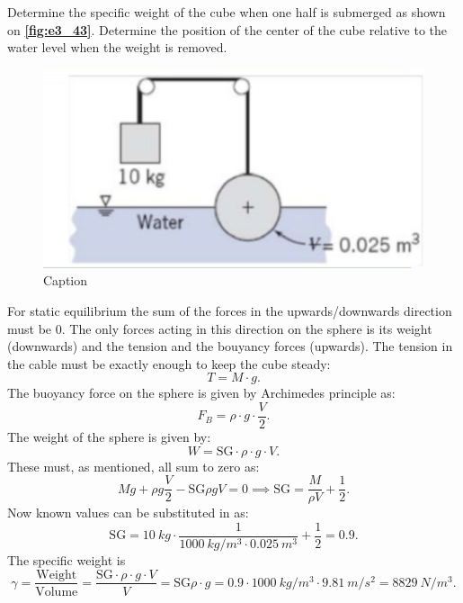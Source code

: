 Determine the specific weight of the cube when one half is submerged as shown on \textbf{\autoref{fig:e3_43}}. Determine the position of the center of the cube relative to the water level when the weight is removed.

\begin{figure} [ht]
  \centering
  \includegraphics[width=0.5\linewidth]{./figures/e3_43.png}
  \caption{Caption}
  \label{fig:e3_43}
\end{figure}
\bigbreak
For static equilibrium the sum of the forces in the upwards/downwards direction must be 0. The only forces acting in this direction on the sphere is its weight (downwards) and the tension and the bouyancy forces (upwards). The tension in the cable must be exactly enough to keep the cube steady:
\[ 
T = M \cdot g 
.\]
The buoyancy force on the sphere is given by Archimedes principle as:
\[ 
F_B = \rho \cdot g \cdot \frac{V}{2} 
.\]
The weight of the sphere is given by:
\[ 
W = \mathrm{SG} \cdot \rho \cdot g \cdot V
.\]
These must, as mentioned, all sum to zero as:
\[ 
M g + \rho g \frac{V}{2} - \mathrm{SG} \rho g V = 0 \implies \mathrm{SG} = \frac{M}{\rho V} + \frac{1}{2}
.\]
Now known values can be substituted in as:
\[ 
\mathrm{SG} = \qty{10}{kg} \cdot \frac{1}{\qty{1000}{kg/m^3} \cdot \qty{0.025}{m^3} } + \frac{1}{2} = \num{0,9} 
.\]
The specific weight is
\[ 
\gamma = \frac{\mathrm{Weight}}{\mathrm{Volume}} = \frac{\mathrm{SG} \cdot \rho \cdot g \cdot V}{V} = \mathrm{SG} \rho \cdot g = \num{0,9}  \cdot \qty{1000}{kg/m^3} \cdot \qty{9,81}{m/s^2} = \qty{8829}{N/m^3}  
.\]

